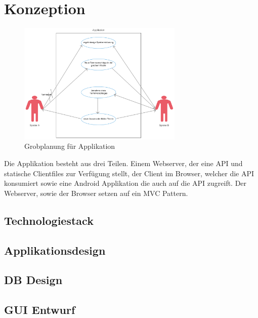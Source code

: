\chapter{Konzeption}
\begin{figure}[ht]
	\centering
	\includegraphics[width=0.7\textwidth]{Graphics/UC2_1.png}
	\caption{Grobplanung für Applikation}
	\label{fig1}
\end{figure}
\FloatBarrier
Die Applikation besteht aus drei Teilen. Einem Webserver, der eine API und statische Clientfiles zur Verfügung stellt, der Client im Browser, welcher die API konsumiert sowie eine Android Applikation die auch auf die API zugreift. 
Der Webserver, sowie der Browser setzen auf ein MVC Pattern. 
 
\section{Technologiestack}
\section{Applikationsdesign}
\section{DB Design}
\section{GUI Entwurf}